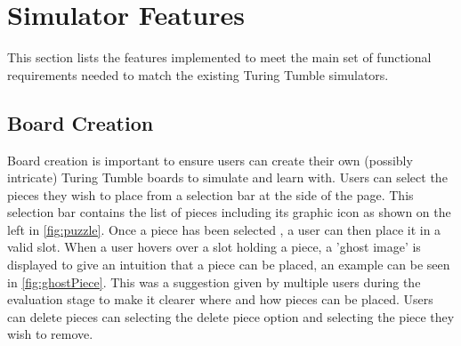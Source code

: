 \documentclass{l4proj}
\begin{document}


\section{Simulator Features}
This section lists the features implemented to meet the main set of functional requirements needed to match the existing Turing Tumble simulators.

\subsection{Board Creation}
Board creation is important to ensure users can create their own (possibly intricate) Turing Tumble boards to simulate and learn with. Users can select the pieces they wish to place from a selection bar at the side of the page. This selection bar contains the list of pieces including its graphic icon as shown on the left in \ref{fig:puzzle}. Once a piece has been selected , a user can then place it in a valid slot. When a user hovers over a slot holding a piece, a 'ghost image' is displayed to give an intuition that a piece can be placed, an example can be seen in \ref{fig:ghostPiece}. This was a suggestion given by multiple users during the evaluation stage to make it clearer where and how pieces can be placed. Users can delete pieces can selecting the delete piece option and selecting the piece they wish to remove.
\end{document}
